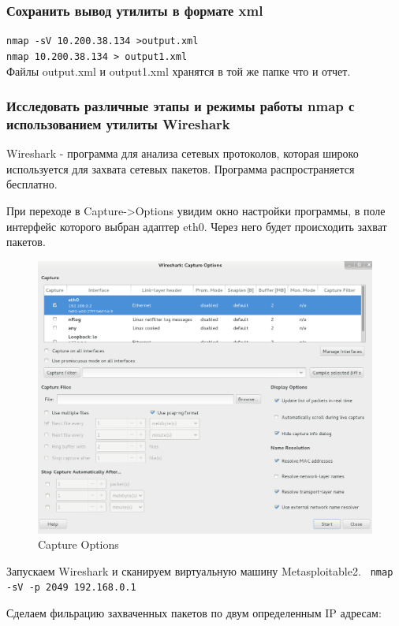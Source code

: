 \documentclass[12pt,a4paper]{article}
\begin{document}
\subsubsection{Сохранить вывод утилиты в формате xml}
\verb+nmap -sV 10.200.38.134 >output.xml+\\
\verb+nmap 10.200.38.134 > output1.xml+\\
Файлы output.xml и output1.xml хранятся в той же папке что и отчет.

\subsubsection{Исследовать различные этапы и режимы работы nmap с использованием утилиты Wireshark}
Wireshark - программа для анализа сетевых протоколов, которая широко используется для захвата сетевых пакетов. Программа распространяется бесплатно. 

При переходе в Capture->Options увидим окно настройки программы, в поле интерфейс которого выбран адаптер eth0. Через него будет происходить захват пакетов.

\FloatBarrier
\begin{figure}[h!]
\centering
\includegraphics[scale=0.5]{res/wireshark}
\caption{Capture Options}
\end{figure}
\FloatBarrier
Запускаем Wireshark и сканируем виртуальную машину Metasploitable2.
\verb+ nmap -sV -p 2049 192.168.0.1+

Сделаем фильрацию захваченных пакетов по двум определенным IP адресам:
\end{document}
